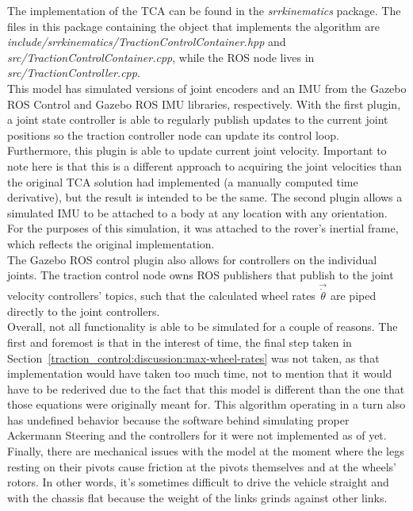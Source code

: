 The implementation of the \ac{TCA} can be found in the \textit{srr\textunderscore kinematics} package. The files in this package containing the object that implements the algorithm are \newline \textit{include/srr\textunderscore kinematics/TractionControlContainer.hpp} and \textit{src/TractionControlContainer.cpp}, while the ROS node lives in \textit{src/TractionController.cpp}. \\

This model has simulated versions of joint encoders and an \ac{IMU} from the Gazebo ROS Control and Gazebo ROS IMU libraries, respectively. With the first plugin, a joint state controller is able to regularly publish updates to the current joint positions so the traction controller node can update its control loop. Furthermore, this plugin is able to update current joint velocity. Important to note here is that this is a different approach to acquiring the joint velocities than the original \ac{TCA} solution had implemented (a manually computed time derivative), but the result is intended to be the same. The second plugin allows a simulated \ac{IMU} to be attached to a body at any location with any orientation. For the purposes of this simulation, it was attached to the rover's inertial frame, which reflects the original implementation. \\

The Gazebo ROS control plugin also allows for controllers on the individual joints. The traction control node owns ROS publishers that publish to the joint velocity controllers' topics, such that the calculated wheel rates $\vec{\dot{\theta}}$ are piped directly to the joint controllers. \\

Overall, not all functionality is able to be simulated for a couple of reasons. The first and foremost is that in the interest of time, the final step taken in Section~\ref{traction_control:discussion:max-wheel-rates} was not taken, as that implementation would have taken too much time, not to mention that it would have to be rederived due to the fact that this model is different than the one that those equations were originally meant for. This algorithm operating in a turn also has undefined behavior because the software behind simulating proper Ackermann Steering and the controllers for it were not implemented as of yet. Finally, there are mechanical issues with the model at the moment where the legs resting on their pivots cause friction at the pivots themselves and at the wheels' rotors. In other words, it's sometimes difficult to drive the vehicle straight and with the chassis flat because the weight of the links grinds against other links.

